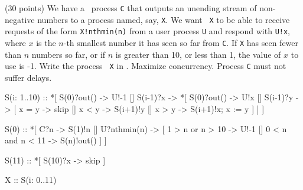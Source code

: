 \item (30 points)
We have a \CSP\ process {\tt C} that outputs an unending stream of
non-negative numbers to a process named, say, {\tt X}.  We want {\tt
X} to be able to receive requests of the form {\tt X!nthmin(n)} from a
user process {\tt U} and respond with {\tt U!x}, where $x$ is the
$n$-th smallest number it has seen so far from {\tt C}.  If {\tt X}
has seen fewer than $n$ numbers so far, or if $n$ is greater than 10,
or less than 1, the value of $x$ to use is -1.  Write the process {\tt
X} in \CSP.  Maximize concurrency.  Process {\tt C} must not suffer
delays.


S(i: 1..10) ::
  *[ S(0)?out() -> U!-1
  [] S(i-1)?x ->
     *[ S(0)?out() -> U!x
     [] S(i-1)?y ->
         [  x = y -> skip
         [] x < y -> S(i+1)!y
         [] x > y -> S(i+1)!x; x := y
         ]
     ]
  ]


S(0) ::
  *[ C?n -> S(1)!n
  [] U?nthmin(n) ->
      [  1 > n or  n > 10 -> U!-1
      [] 0 < n and n < 11 -> S(n)!out()
      ]
  ]


S(11) ::  *[ S(10)?x -> skip ]

X :: S(i: 0..11)
